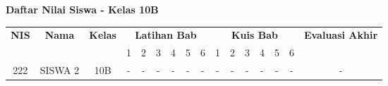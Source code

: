 \documentclass[a4paper,12pt]{article}
\begin{document}
\begin{landscape}
\begin{center}
{\Large \textbf{Daftar Nilai Siswa - Kelas 10B}}
\end{center}

\vspace{0.5cm}

\begin{longtable}{|c|c|c|*{6}{c}|*{6}{c}|c|}
\hline
\rowcolor{gray}
\textbf{NIS} & \textbf{Nama} & \textbf{Kelas} & \multicolumn{6}{c|}{\textbf{Latihan Bab}} & \multicolumn{6}{c|}{\textbf{Kuis Bab}} & \textbf{Evaluasi Akhir} \\
\cline{4-15}
\rowcolor{gray}
& & & 1 & 2 & 3 & 4 & 5 & 6 & 1 & 2 & 3 & 4 & 5 & 6 & \\
\hline
\endhead
222 & SISWA 2 & 10B & - & - & - & - & - & - & - & - & - & - & - & - & - \\ \hline

\end{longtable}
\end{landscape}
\end{document}
